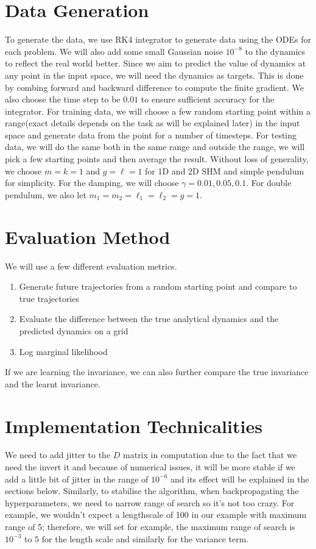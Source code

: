 \documentclass{statsmsc}
\begin{document}
\section{Data Generation}
To generate the data, we use RK4 integrator to generate data using the ODEs for each problem. 
We will also add some small Gaussian noise $10^{-8}$ to the dynamics to reflect the real world better.
Since we aim to predict the value of dynamics at any point in the input space, we will need the dynamics as targets. 
This is done by combing forward and backward difference to compute the finite gradient. 
We also choose the time step to be $0.01$ to ensure sufficient accuracy for the integrator.
For training data, we will choose a few random starting point within a range(exact details depends on the task as will be explained later) in the input space and generate data from the point for a number of timesteps. 
For testing data, we will do the same both in the same range and outside the range, we will pick a few starting points and then average the result.
Without loss of generality, we choose $m=k=1$ and $g=\ell=1$ for 1D and 2D SHM and simple pendulum for simplicity. For the damping, we will choose $\gamma=0.01, 0.05, 0.1$. 
For double pendulum, we also let $m_1=m_2=\ell_1=\ell_2=g=1.$

\section{Evaluation Method}
We will use a few different evaluation metrics. 
\begin{enumerate}
    \item Generate future trajectories from a random starting point and compare to true trajectories
    \item Evaluate the difference between the true analytical dynamics and the predicted dynamics on a grid
    \item Log marginal likelihood
\end{enumerate}
If we are learning the invariance, we can also further compare the true invariance and the learnt invariance.

\section{Implementation Technicalities}
We need to add jitter to the $D$ matrix in computation due to the fact that we need the invert it and because of numerical issues, it will be more stable if we add a little bit of jitter in the range of $10^{-6}$ and its effect will be explained in the sections below.
Similarly, to stabilise the algorithm, when backpropagating the hyperparameters, we need to narrow range of search so it's not too crazy. 
For example, we wouldn't expect a lengthscale of 100 in our example with maximum range of 5; therefore, we will set for example, the maximum range of search is $10^{-3}$ to $5$ for the length scale and similarly for the variance term.
\end{document}
